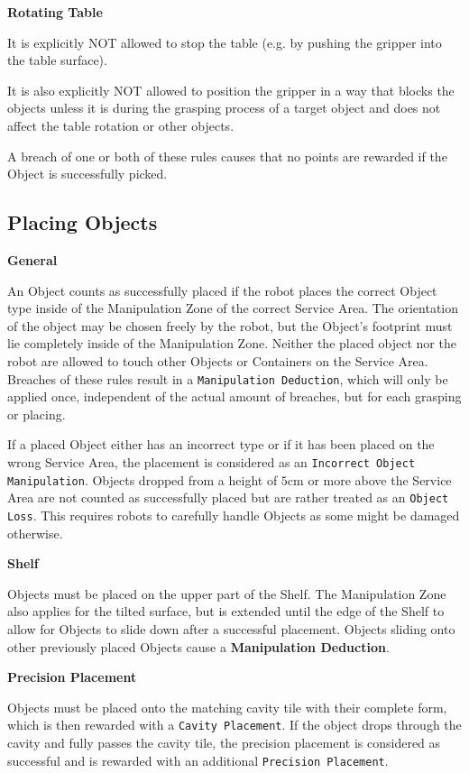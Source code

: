 \textbf{Rotating Table}

It is explicitly NOT allowed to stop the table (e.g. by pushing the gripper into the table surface).

It is also explicitly NOT allowed to position the gripper in a way that blocks the objects 
unless it is during the grasping process of a target object and does not affect the table rotation or other objects.

A breach of one or both of these rules causes that no points are rewarded if the Object is successfully picked.

\subsection{Placing Objects} \label{ssec:PlacingObjects}

\textbf{General}

An Object counts as successfully placed if the robot places the correct Object type inside of the Manipulation Zone of the correct Service Area. The orientation of the object may be chosen freely by the robot, but the Object's footprint must lie completely inside of the Manipulation Zone.
Neither the placed object nor the robot are allowed to touch other Objects or Containers on the Service Area.
Breaches of these rules result in a \texttt{Manipulation Deduction}, which will only be applied once, independent of the actual amount of breaches, but for each grasping or placing.

If a placed Object either has an incorrect type or if it has been placed on the wrong Service Area, 
the placement is considered as an \texttt{Incorrect Object Manipulation}. 
Objects dropped from a height of $5\si{\centi\meter}$ or more above the Service Area are not counted as successfully placed but are rather treated as an \texttt{Object Loss}. This requires robots to carefully handle Objects as some might be damaged otherwise.


\textbf{Shelf}

Objects must be placed on the upper part of the Shelf.
The Manipulation Zone also applies for the tilted surface, but is extended until the edge of the Shelf to allow for Objects to slide down after a successful placement. Objects sliding onto other previously placed Objects cause a \textbf{Manipulation Deduction}.

\clearpage

\textbf{Precision Placement}

Objects must be placed onto the matching cavity tile with their complete form, which is then rewarded with a \texttt{Cavity Placement}.
If the object drops through the cavity and fully passes the cavity tile, the precision placement is considered as successful and is rewarded with an additional \texttt{Precision Placement}. 

